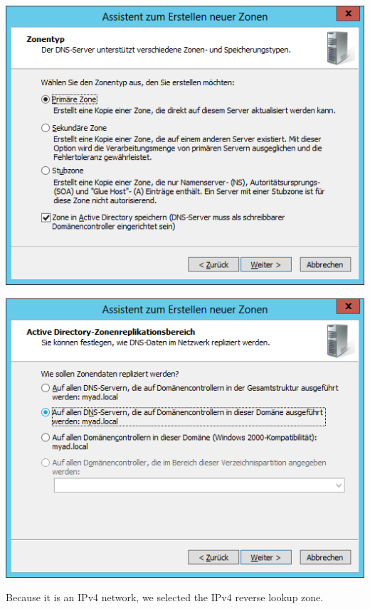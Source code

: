 \begin{minipage}[X]{0.8\textwidth} 
	\centering 
\includegraphics [scale=0.6]{graphics/2.png}
	\label{ecoconcept} 
\end{minipage} 


\begin{minipage}[X]{0.8\textwidth} 
	\centering 
	\includegraphics [scale=0.6]{graphics/3.png}	
	\label{ecoconcept} 
\end{minipage} \newline


Because it is an IPv4 network, we selected the IPv4 reverse lookup zone.\newline


